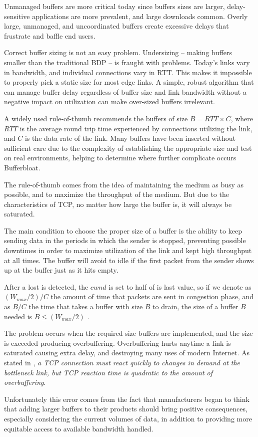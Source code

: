 Unmanaged buffers are more critical today since buffers sizes are larger,
delay-sensitive applications are more prevalent, and large downloads common.
Overly large, unmanaged, and uncoordinated buffers create excessive delays
that frustrate and baffle end users.

Correct buffer sizing is not an easy problem. Undersizing -- making buffers
smaller than the traditional BDP -- is fraught with problems. Today's links vary
in bandwidth, and individual connections vary in RTT. This makes it impossible
to properly pick a static size for most edge links. A simple, robust algorithm
that can manage buffer delay regardless of buffer size and link bandwidth
without a negative impact on utilization can make over-sized buffers
irrelevant.

A widely used rule-of-thumb recommends the buffers of size $B = \overline{RTT}
\times C $, where $\overline{RTT}$ is the average round trip time experienced by
connections utilizing the link, and $C$ is the data rate of the link. Many
buffers have been inserted without sufficient care due to the complexity of
establishing the appropriate size and test on real environments\cite{Vu-Brugier},
helping to determine where further complicate occurs Bufferbloat.

The rule-of-thumb comes from the idea of maintaining the medium as
busy as possible, and to maximize the throughput of the medium. But due to the
characteristics of TCP, no matter how large the buffer is, it will always be
saturated.

The main condition to choose the proper size of a buffer is the ability to
keep sending data in the periods in which the sender is stopped, preventing
possible downtimes in order to maximize utilization of the link and kept high
throughput at all times. The buffer will avoid to idle if the first packet
from the sender shows up at the buffer just as it hits empty.

After a lost is detected, the $cwnd$ is set to half of is last value, so if we
denote as $(W_{max} /2)/C$ the amount of time that packets are sent in
congestion phase, and as $B/C$ the time that takes a buffer with size $B$ to
drain, the size of a buffer $B$ needed is $B \leq (W_{max} /2)$
\cite{main:ref:1}.

The problem occurs when the required size buffers are implemented, and the
size is exceeded producing overbuffering. Overbuffering hurts anytime a link
is saturated causing extra delay, and destroying many uses of modern Internet.
As stated in \cite{GettysNichols}, \emph{a TCP connection must react quickly
to changes in demand at the bottleneck link, but TCP reaction time is
quadratic to the amount of overbuffering}.

Unfortunately this error comes from the fact that manufacturers began to think
that adding larger buffers to their products should bring positive consequences,
especially considering the current volumes of data, in addition to providing
more equitable access to available bandwidth handled.
